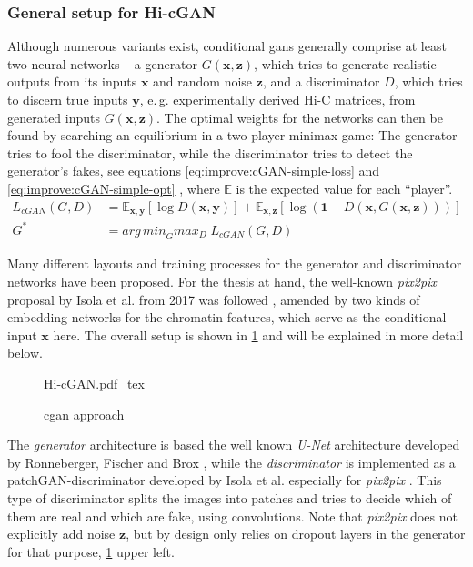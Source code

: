 \subsubsection{General setup for Hi-cGAN}
Although numerous variants exist, conditional \acrshort{gan}s generally comprise at least two neural networks -- 
a generator $G(\bm{x},\bm{z})$, which tries to generate realistic outputs from its inputs $\bm{x}$ and random noise $\bm{z}$, 
and a discriminator $D$, which tries to discern true inputs $\bm{y}$, e.\,g. experimentally derived Hi-C matrices, 
from generated inputs $G(\bm{x},\bm{z})$.
The optimal weights for the networks can then be found by searching an equilibrium in a two-player minimax game:
The generator tries to fool the discriminator, while the discriminator tries to detect the generator's fakes, 
see equations \ref{eq:improve:cGAN-simple-loss} and \ref{eq:improve:cGAN-simple-opt} \cite{Isola2017}, where $\mathbb{E}$ is the expected value for each ``player''.
\begin{align}
 L_\mathit{cGAN}(G, D) &= \mathbb{E}_{\bm{x},\bm{y}}[\log D(\bm{x},\bm{y})] + \mathbb{E}_{\bm{x},\bm{z}}[\log(\bm{1}-D(\bm{x}, G(\bm{x},\bm{z})))] \label{eq:improve:cGAN-simple-loss} \\
 G^* &=  \mathit{arg\,min}_G \mathit{max}_D \; L_\mathit{cGAN}(G, D) \label{eq:improve:cGAN-simple-opt}
\end{align}

Many different layouts and training processes for the generator and discriminator networks have been proposed.
For the thesis at hand, the well-known \emph{pix2pix} proposal by Isola et al. from 2017 was followed \cite{Isola2017}, 
amended by two kinds of embedding networks for the chromatin features, which serve as the conditional input $\bm{x}$ here.
The overall setup is shown in \cref{fig:improve:cGAN-approach} and will be explained in more detail below.
\begin{figure}[htbp]
 {Hi-cGAN.pdf_tex}
 \caption{\acrshort{cgan} approach} \label{fig:improve:cGAN-approach}
\end{figure}

The \emph{generator} architecture is based the well known \emph{U-Net} architecture developed by Ronneberger, Fischer and Brox \cite{Ronneberger2015},
while the \emph{discriminator} is implemented as a patchGAN-discriminator developed by Isola et al. especially for \emph{pix2pix} \cite{Isola2017}.
This type of discriminator splits the images into patches and tries to decide which of them are real and which are fake, using convolutions.
Note that \emph{pix2pix} does not explicitly add noise $\bm{z}$, 
but by design only relies on dropout layers in the generator for that purpose, \cref{fig:improve:cGAN-approach} upper left. 

